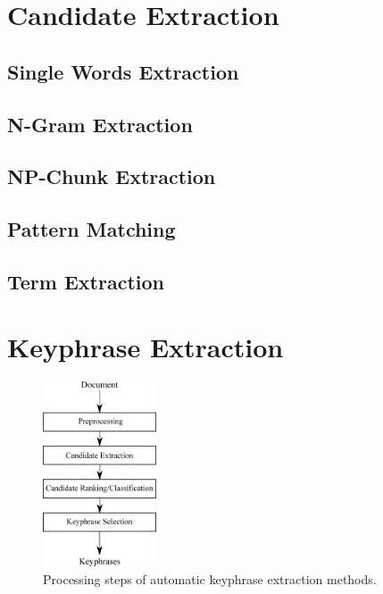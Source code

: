 
\section{Candidate Extraction}
\label{sec:candidate_extraction}

  \subsection{Single Words Extraction}
  \label{subsec:single_words_extraction}
  \subsection{N-Gram Extraction}
  \label{subsec:n_gram_extraction}
  \subsection{NP-Chunk Extraction}
  \label{subsec:np_chunk_extraction}
  \subsection{Pattern Matching}
  \label{subsec:pattern_matching}
  \subsection{Term Extraction}
  \label{subsec:term_extraction}

\section{Keyphrase Extraction}
\label{sec:keyphrase_extraction}
  \begin{figure}
    \centering
    \includegraphics[width=0.3\textwidth]{include/processing_steps.eps}
    \caption{Processing steps of automatic keyphrase extraction methods.
             \label{fig:processing_steps}}
  \end{figure}

